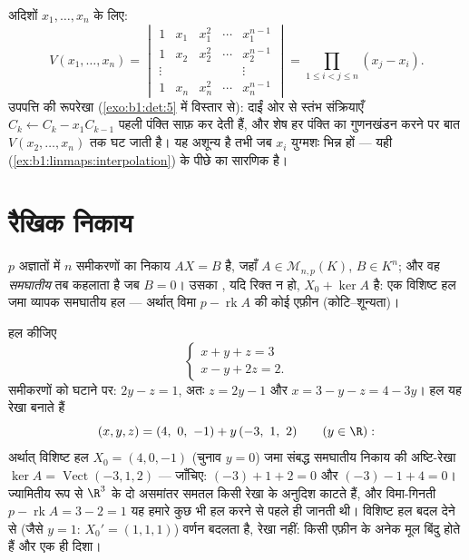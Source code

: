 \begin{example}[वांडरमोंड सारणिक]\label{ex:b1:det:vandermonde}
अदिशों $x_1, \dots, x_n$ के लिए:
\[
V(x_1, \dots, x_n) =
\begin{vmatrix}
1 & x_1 & x_1^2 & \cdots & x_1^{n-1}\\
1 & x_2 & x_2^2 & \cdots & x_2^{n-1}\\
\vdots & & & & \vdots\\
1 & x_n & x_n^2 & \cdots & x_n^{n-1}
\end{vmatrix}
= \prod_{1 \leq i < j \leq n} (x_j - x_i) .
\]
उपपत्ति की रूपरेखा (\cref{exo:b1:det:5} में विस्तार से): दाईं ओर से स्तंभ
संक्रियाएँ $C_k \leftarrow C_k - x_1 C_{k-1}$ पहली पंक्ति साफ़ कर देती हैं,
और शेष हर पंक्ति का गुणनखंडन करने पर बात $V(x_2, \dots, x_n)$ तक घट जाती है।
यह अशून्य है तभी जब $x_i$ युग्मशः भिन्न हों --- यही 
(\cref{ex:b1:linmaps:interpolation}) के पीछे का सारणिक है।
\end{example}

\section{रैखिक निकाय}

\begin{definition}\label{def:b1:det:system}
$p$ अज्ञातों में $n$ समीकरणों का  निकाय $AX = B$ है,
जहाँ $A \in \mathcal{M}_{n,p}(K)$, $B \in K^n$; और वह \emph{समघातीय} तब
कहलाता है जब $B = 0$। उसका , यदि रिक्त न हो, $X_0 + \ker A$ है: एक
विशिष्ट हल जमा व्यापक समघातीय हल --- अर्थात् विमा $p - \operatorname{rk} A$
की कोई एफ़ीन  (कोटि--शून्यता)।
\end{definition}

\begin{example}[एफ़ीन संरचना, दिखाई देती हुई]
\label{ex:b1:det:affinestructure}
हल कीजिए
\[
\begin{cases}
x + y + z = 3\\
x - y + 2z = 2 .
\end{cases}
\]
समीकरणों को घटाने पर: $2y - z = 1$, अतः $z = 2y - 1$ और $x = 3 - y - z = 4 -
3y$। हल यह रेखा बनाते हैं
\[
(x, y, z) = (4,\ 0,\ -1) + y\,(-3,\ 1,\ 2)
\qquad (y \in \R):
\]
अर्थात् विशिष्ट हल $X_0 = (4, 0, -1)$ (चुनाव $y = 0$) जमा संबद्ध समघातीय
निकाय की अष्टि-रेखा $\ker A = \operatorname{Vect}(-3, 1, 2)$ --- जाँचिए:
$(-3) + 1 + 2 = 0$ और $(-3) - 1 + 4 = 0$। ज्यामितीय रूप से $\R^3$ के दो
असमांतर समतल किसी रेखा के अनुदिश काटते हैं, और विमा-गिनती $p -
\operatorname{rk} A = 3 - 2 = 1$ यह हमारे कुछ भी हल करने से पहले ही जानती
थी। विशिष्ट हल बदल देने से (जैसे $y = 1$: $X_0' = (1, 1, 1)$) वर्णन बदलता
है, रेखा नहीं: किसी एफ़ीन  के अनेक मूल बिंदु होते हैं और एक ही दिशा।
\end{example}

